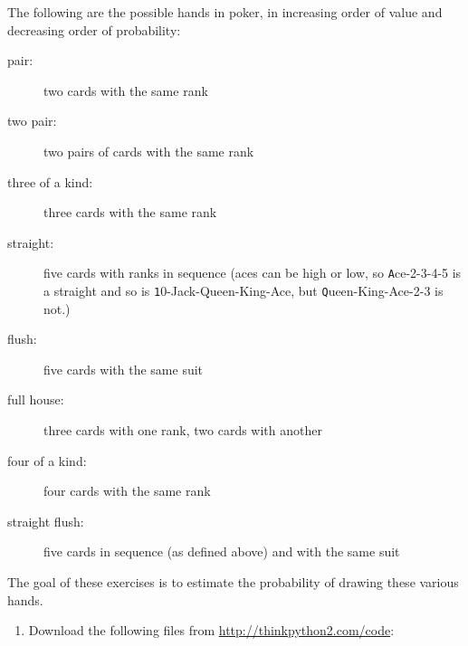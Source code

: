 \documentclass[
DIV=11,
fontsize=13,
twoside,
headinclude=false,
titlepage=firstiscover,
abstract=true,
headsepline=true,
footsepline=true,
chapterprefix=true, %
headings=big,
bibliography=totoc,%
captions=tableheading
]{scrbook}
\theoremstyle{definition}
\begin{document}
\begin{exercise}
\normalfont
\label{poker}

The following are the possible hands in poker, in increasing order
of value and decreasing order of probability:

\begin{description}

\item[pair:] two cards with the same rank
\vspace{-0.05in}

\item[two pair:] two pairs of cards with the same rank
\vspace{-0.05in}

\item[three of a kind:] three cards with the same rank
\vspace{-0.05in}

\item[straight:] five cards with ranks in sequence (aces can
be high or low, so {\texttt Ace-2-3-4-5} is a straight and so is {\texttt
10-Jack-Queen-King-Ace}, but {\texttt Queen-King-Ace-2-3} is not.)
\vspace{-0.05in}

\item[flush:] five cards with the same suit
\vspace{-0.05in}

\item[full house:] three cards with one rank, two cards with another
\vspace{-0.05in}

\item[four of a kind:] four cards with the same rank
\vspace{-0.05in}

\item[straight flush:] five cards in sequence (as defined above) and
with the same suit
\vspace{-0.05in}

\end{description}
%
The goal of these exercises is to estimate
the probability of drawing these various hands.

\begin{enumerate}

\item Download the following files from \url{http://thinkpython2.com/code}:

\begin{description}


\end{description}
\end{enumerate}
\end{exercise}
\end{document}
